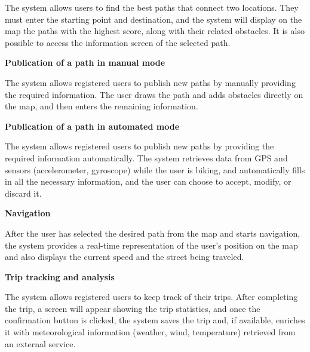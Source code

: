     \noindent
     The system allows users to find the best paths that connect two locations. They must enter the starting point and destination, and the system will display on the map the paths with the highest score, along with their related obstacles. It is also possible to access the information screen of the selected path.

    \vspace{2mm}
    \noindent
    \textbf{Publication of a path in manual mode} 
    \vspace{1mm}
    
    \noindent
     The system allows registered users to publish new paths by manually providing the required information.
    The user draws the path and adds obstacles directly on the map, and then enters the remaining information.

    \vspace{2mm}
    \newpage
    \noindent
    \textbf{Publication of a path in automated mode} 
    \vspace{1mm}
    
    \noindent
     The system allows registered users to publish new paths by providing the required information automatically.
    The system retrieves data from GPS and sensors (accelerometer, gyroscope) while the user is biking, and automatically fills in all the necessary information, and the user can choose to accept, modify, or discard it.

    \vspace{2mm}
    \noindent
    \textbf{Navigation} 
    \vspace{1mm}
    
    \noindent
     After the user has selected the desired path from the map and starts navigation, the system provides a real-time representation of the user’s position on the map and also displays the current speed and the street being traveled.

    \vspace{2mm}
    \noindent
    \textbf{Trip tracking and analysis} 
    \vspace{1mm}
    
    \noindent
    The system allows registered users to keep track of their trips. After completing the trip, a screen will appear showing the trip statistics, and once the confirmation button is clicked, the system saves the trip and, if available, enriches it with meteorological information (weather, wind, temperature) retrieved from an external service.

